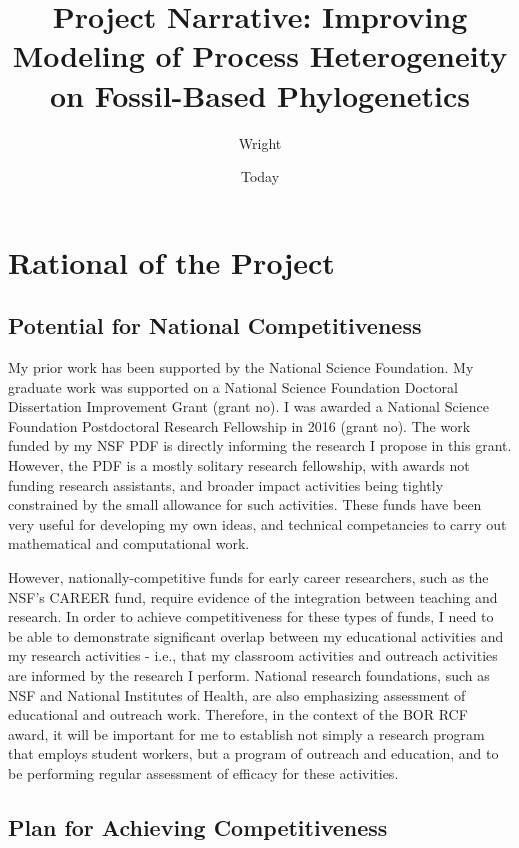 \documentclass[]{article}
\begin{document}
\title{Project Narrative: Improving Modeling of Process Heterogeneity on Fossil-Based Phylogenetics}
\author{Wright}
\date{Today}
\maketitle

\section{Rational of the Project}
\subsection{Potential for National Competitiveness}

My prior work has been supported by the National Science Foundation. 
My graduate work was supported on a National Science Foundation Doctoral Dissertation Improvement Grant (grant no).
I was awarded a National Science Foundation Postdoctoral Research Fellowship in 2016 (grant no).
The work funded by my NSF PDF is directly informing the research I propose in this grant.
However, the PDF is a mostly solitary research fellowship, with awards not funding research assistants, and broader impact activities being tightly constrained by the small allowance for such activities. 
These funds have been very useful for developing my own ideas, and technical competancies to carry out mathematical and computational work. \par
However, nationally-competitive funds for early career researchers, such as the NSF's CAREER fund, require evidence of the integration between teaching and research. 
In order to achieve competitiveness for these types of funds, I need to be able to demonstrate significant overlap between my educational activities and my research activities - i.e., that my classroom activities and outreach activities are informed by the research I perform.
National research foundations, such as NSF and National Institutes of Health, are also emphasizing  assessment of educational and outreach work.
Therefore, in the context of the BOR RCF award, it will be important for me to establish not simply a research program that employs student workers, but a program of outreach and education, and to be performing regular assessment of efficacy for these activities. \par
 

\subsection{Plan for Achieving Competitiveness}
\end{document}
